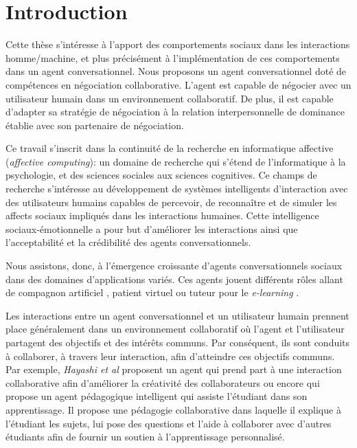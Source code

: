 \chapter{Introduction}


Cette thèse s'intéresse à l'apport des comportements sociaux dans les interactions homme/machine, et plus précisément à l'implémentation de ces comportements dans un agent conversationnel. Nous proposons un agent conversationnel doté de compétences en négociation collaborative. L'agent est capable de négocier avec un utilisateur humain dans un environnement collaboratif. De plus, il est capable d'adapter sa stratégie de négociation à la relation interpersonnelle de dominance établie avec son partenaire de négociation. 


Ce travail s'inscrit dans la continuité de la recherche en informatique affective (\emph{affective computing}): un domaine de recherche qui s'étend de l'informatique à la psychologie, et des sciences sociales aux sciences cognitives. Ce champs de recherche s'intéresse au développement de systèmes intelligents d'interaction avec des utilisateurs humains capables de percevoir, de reconnaître et de simuler les affects sociaux impliqués dans les interactions humaines. Cette intelligence sociaux-émotionnelle a pour but d'améliorer les interactions ainsi que l'acceptabilité et la crédibilité des agents conversationnels. 

Nous assistons, donc, à l'émergence croissante d'agents conversationnels sociaux dans des domaines d'applications variés.  Ces agents jouent différents rôles allant de compagnon artificiel \cite{ring2013addressing,sidner2013always}, patient virtuel \cite{kenny2007virtual,kleinheksel2017virtual} ou tuteur pour le \emph{e-learning}  \cite{kerly2008calmsystem,kerry2009conversational}.

Les interactions entre un agent conversationnel et un utilisateur humain prennent place généralement dans un environnement collaboratif où l'agent et l'utilisateur partagent des objectifs et des intérêts communs. 
Par conséquent, ils sont conduits à collaborer, à travers leur interaction, afin d'atteindre ces objectifs communs. 
Par exemple, \emph{Hayashi et al} proposent un agent qui prend part à une interaction collaborative afin d'améliorer la créativité des collaborateurs \cite{hayashi2013embodied} ou encore \cite{soliman2010intelligent} qui propose un agent pédagogique intelligent qui assiste  l'étudiant dans son apprentissage. Il propose une pédagogie collaborative dans laquelle il explique à l'étudiant les sujets, lui pose des questions et l'aide à collaborer avec d'autres étudiants afin de fournir un soutien à l'apprentissage personnalisé.

